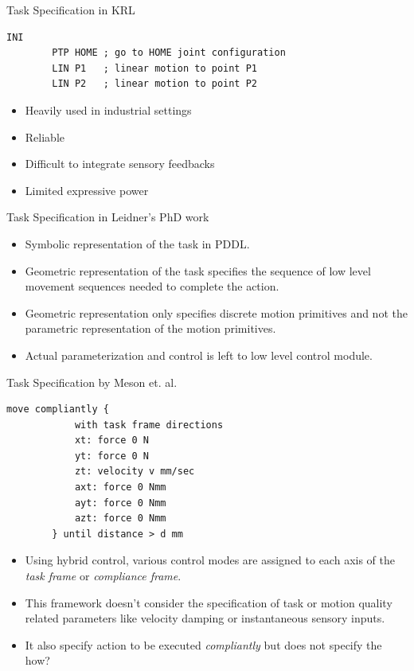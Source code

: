 \documentclass[10pt]{beamer}
\begin{document}
\begin{frame}[fragile]{Task Specification in KRL}
	
	\begin{lstlisting}[label=KRL-sample,caption=KRL code]
		INI
		PTP HOME ; go to HOME joint configuration
		LIN P1   ; linear motion to point P1
		LIN P2	 ; linear motion to point P2
	\end{lstlisting}
	\begin{itemize}
		\item Heavily used in industrial settings 
		\item Reliable
		\item Difficult to integrate sensory feedbacks
		\item Limited expressive power \cite{leidner2017cognitive}
	\end{itemize}
\end{frame}

\begin{frame}[fragile]{Task Specification in Leidner's PhD work\cite{leidner2017cognitive}}
	\begin{itemize}
		\item Symbolic representation of the task in PDDL. 
		\item Geometric representation of the task specifies the sequence of low level movement sequences needed to complete the action. 
		\item Geometric representation only specifies discrete motion primitives and not the parametric representation of the motion primitives. 
		\item Actual parameterization and control is left to low level control module. 
	\end{itemize}
\end{frame}

\begin{frame}[fragile]{Task Specification by Meson et. al. \cite{mason1981compliance}}
	
	\begin{lstlisting}[label=tff,caption=Task Specification using TFF: Open Door]
		move compliantly {
			with task frame directions
			xt: force 0 N
			yt: force 0 N
			zt: velocity v mm/sec
			axt: force 0 Nmm
			ayt: force 0 Nmm
			azt: force 0 Nmm
		} until distance > d mm 
	\end{lstlisting}
	

\end{frame}

\begin{frame}
	\begin{itemize}
		\item Using hybrid control, various control modes are assigned to each axis of the \textit{task frame} or \textit{compliance frame}\cite{nagele2018prototype}. 
		\item This framework doesn't consider the specification of task or motion quality related parameters like velocity damping or instantaneous sensory inputs. 
		\item It also specify action to be executed \textit{compliantly} but does not specify the how? 
	\end{itemize}
\end{frame}
\end{document}
